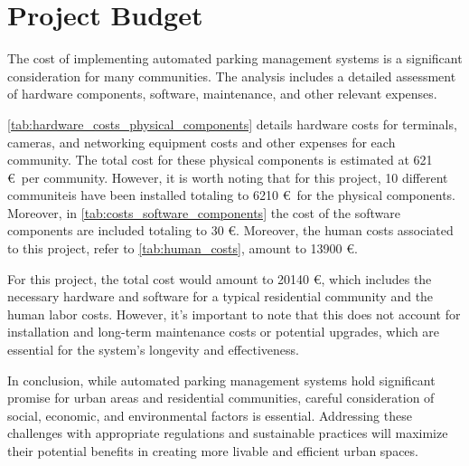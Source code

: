 \section{Project Budget}

The cost of implementing automated parking management systems is a significant consideration for many communities. The analysis includes a detailed assessment of hardware components, software, maintenance, and other relevant expenses.

\cref{tab:hardware_costs_physical_components} details hardware costs for terminals, cameras, and networking equipment costs and other expenses for each community. The total cost for these physical components is estimated at 621 \euro\ per community. However, it is worth noting that for this project, 10 different communiteis have been installed totaling to 6210 \euro\ for the physical components. Moreover, in \cref{tab:costs_software_components} the cost of the software components are included totaling to 30 \euro. Moreover, the human costs associated to this project, refer to \cref{tab:human_costs}, amount to 13900 \euro.

For this project, the total cost would amount to 20140 \euro, which includes the necessary hardware and software for a typical residential community and the human labor costs. However, it's important to note that this does not account for installation and long-term maintenance costs or potential upgrades, which are essential for the system's longevity and effectiveness.

In conclusion, while automated parking management systems hold significant promise for urban areas and residential communities, careful consideration of social, economic, and environmental factors is essential. Addressing these challenges with appropriate regulations and sustainable practices will maximize their potential benefits in creating more livable and efficient urban spaces.

